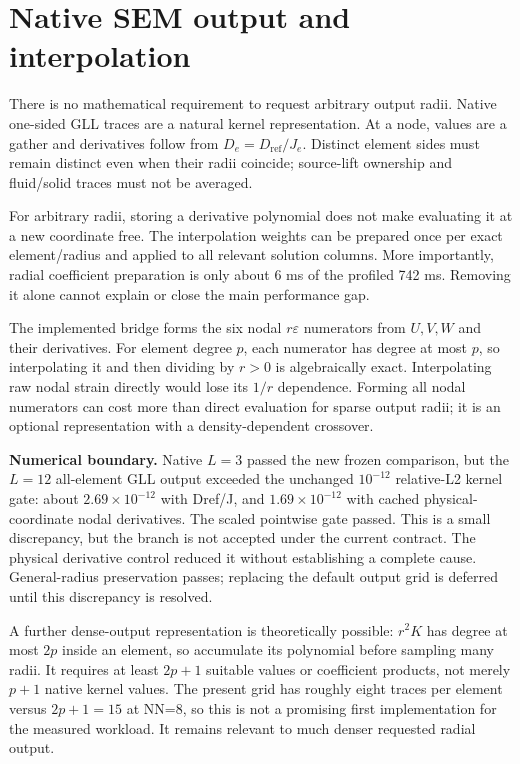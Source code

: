 \AblationText

\section{Native SEM output and interpolation}
There is no mathematical requirement to request arbitrary output radii. Native one-sided GLL traces are a natural kernel representation. At a node, values are a gather and derivatives follow from $D_e=D_{\mathrm{ref}}/J_e$. Distinct element sides must remain distinct even when their radii coincide; source-lift ownership and fluid/solid traces must not be averaged.

For arbitrary radii, storing a derivative polynomial does not make evaluating it at a new coordinate free. The interpolation weights can be prepared once per exact element/radius and applied to all relevant solution columns. More importantly, radial coefficient preparation is only about 6 ms of the profiled 742 ms. Removing it alone cannot explain or close the main performance gap.

The implemented bridge forms the six nodal $r\varepsilon$ numerators from $U,V,W$ and their derivatives. For element degree $p$, each numerator has degree at most $p$, so interpolating it and then dividing by $r>0$ is algebraically exact. Interpolating raw nodal strain directly would lose its $1/r$ dependence. Forming all nodal numerators can cost more than direct evaluation for sparse output radii; it is an optional representation with a density-dependent crossover.

\textbf{Numerical boundary.} Native $L=3$ passed the new frozen comparison, but the $L=12$ all-element GLL output exceeded the unchanged $10^{-12}$ relative-L2 kernel gate: about $2.69\times10^{-12}$ with Dref/J, and $1.69\times10^{-12}$ with cached physical-coordinate nodal derivatives. The scaled pointwise gate passed. This is a small discrepancy, but the branch is not accepted under the current contract. The physical derivative control reduced it without establishing a complete cause. General-radius preservation passes; replacing the default output grid is deferred until this discrepancy is resolved.

A further dense-output representation is theoretically possible: $r^2K$ has degree at most $2p$ inside an element, so accumulate its polynomial before sampling many radii. It requires at least $2p+1$ suitable values or coefficient products, not merely $p+1$ native kernel values. The present grid has roughly eight traces per element versus $2p+1=15$ at NN=8, so this is not a promising first implementation for the measured workload. It remains relevant to much denser requested radial output.

